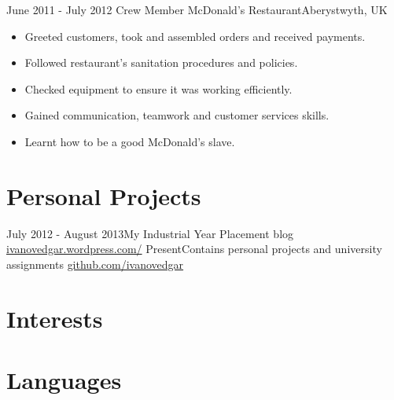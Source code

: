 \documentclass[11pt,a4paper]{moderncv}
\begin{document}
\cventry
	{June 2011 - July 2012 }{Crew Member}
	{McDonald's Restaurant}{Aberystwyth, UK}
	{}{
    	\begin{itemize}
           \item Greeted customers, took and assembled orders and received payments.
           \item Followed restaurant's sanitation procedures and policies.
           \item Checked equipment to ensure it was working efficiently.
           \item Gained communication, teamwork and customer services skills.
           \item Learnt how to be a good McDonald's slave.
    	\end{itemize}
	}
	
\section{Personal Projects}
\cventry
	{July 2012 - August 2013}{My Industrial Year Placement blog}
	{\href{http://ivanovedgar.wordpress.com/}{ivanovedgar.wordpress.com/}}{}
	{}{}
\cventry
	{Present}{Contains personal projects and university assignments}
	{\href{http://github.com/ivanovedgar}{github.com/ivanovedgar}}{}
	{}{}

\section{Interests}

\section{Languages}
\end{document}
